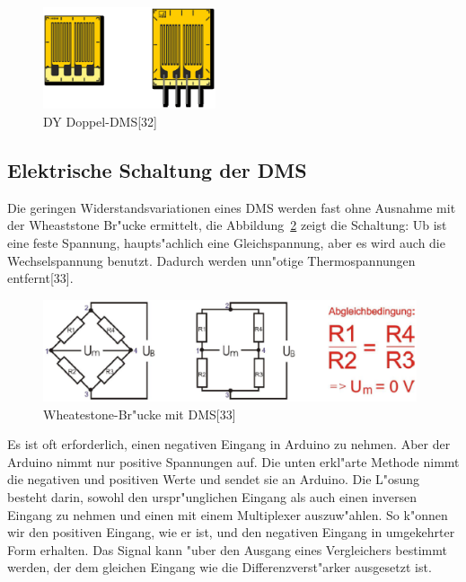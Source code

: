 \begin{figure}[!htb]
\begin{center}
\includegraphics[height=3cm]{bilder/DY.eps}
\end{center}
\caption{DY Doppel-DMS[32]}\label{fig:DY}
\end{figure}


%
\subsection{Elektrische Schaltung der DMS}
Die geringen Widerstandsvariationen eines DMS werden fast ohne 
Ausnahme mit der Wheaststone Br"ucke ermittelt, 
die Abbildung~\ref{fig:w} zeigt die Schaltung: Ub ist eine feste Spannung, 
haupts"achlich eine Gleichspannung, aber es wird auch die Wechselspannung benutzt. 
Dadurch werden unn"otige Thermospannungen entfernt[33].


\begin{figure}[!htb]
\begin{center}
\includegraphics[height=3cm]{bilder/w.eps}
\end{center}
\caption{Wheatestone-Br"ucke mit DMS[33]}\label{fig:w}
\end{figure}





Es ist oft erforderlich, einen negativen Eingang in Arduino zu nehmen. 
 Aber der Arduino nimmt  nur positive Spannungen auf. 
Die unten erkl"arte Methode nimmt die negativen und positiven Werte und 
sendet sie  an Arduino. Die L"osung besteht darin, sowohl den urspr"unglichen 
Eingang als auch einen inversen Eingang zu nehmen und einen mit einem 
Multiplexer auszuw"ahlen. So k"onnen wir den positiven Eingang, wie er ist, 
und den negativen Eingang in umgekehrter Form erhalten. 
Das Signal kann "uber den Ausgang eines Vergleichers bestimmt werden, 
der dem gleichen Eingang wie die Differenzverst"arker ausgesetzt ist.

